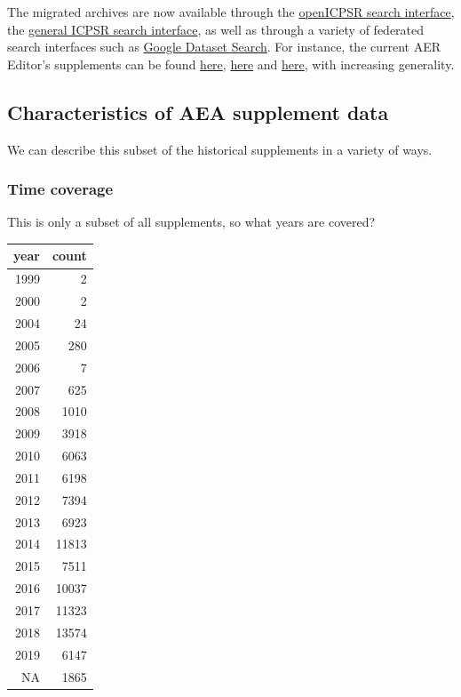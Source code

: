 \documentclass[]{article}
\begin{document}
The migrated archives are now available through the
\href{https://www.openicpsr.org/openicpsr/search/aea/studies}{openICPSR
search interface}, the
\href{https://www.icpsr.umich.edu/icpsrweb/ICPSR/search/studies}{general
ICPSR search interface}, as well as through a variety of federated
search interfaces such as
\href{https://toolbox.google.com/datasetsearch/search}{Google Dataset
Search}. For instance, the current AER Editor's supplements can be found
\href{https://www.openicpsr.org/openicpsr/search/aea/studies?start=0\&ARCHIVE=aea\&sort=score\%20desc\%2CTITLE_SORT\%20asc\&rows=25\&q=esther\%20duflo}{here},
\href{https://www.icpsr.umich.edu/icpsrweb/ICPSR/search/studies?start=0\&ARCHIVE=ICPSR\&PUBLISH_STATUS=PUBLISHED\&sort=score\%20desc\%2CTITLE_SORT\%20asc\&rows=50\&q=esther\%20duflo}{here}
and
\href{https://toolbox.google.com/datasetsearch/search?query=esther\%20duflo}{here},
with increasing generality.

\hypertarget{characteristics-of-aea-supplement-data}{%
\subsection{Characteristics of AEA supplement
data}\label{characteristics-of-aea-supplement-data}}

We can describe this subset of the historical supplements in a variety
of ways.

\hypertarget{time-coverage}{%
\subsubsection{Time coverage}\label{time-coverage}}

This is only a subset of all supplements, so what years are covered?

\begin{table}[H]
\centering
\begin{tabular}{r|r}
\hline
year & count\\
\hline
1999 & 2\\
\hline
2000 & 2\\
\hline
2004 & 24\\
\hline
2005 & 280\\
\hline
2006 & 7\\
\hline
2007 & 625\\
\hline
2008 & 1010\\
\hline
2009 & 3918\\
\hline
2010 & 6063\\
\hline
2011 & 6198\\
\hline
2012 & 7394\\
\hline
2013 & 6923\\
\hline
2014 & 11813\\
\hline
2015 & 7511\\
\hline
2016 & 10037\\
\hline
2017 & 11323\\
\hline
2018 & 13574\\
\hline
2019 & 6147\\
\hline
NA & 1865\\
\hline
\end{tabular}
\end{table}
\end{document}
